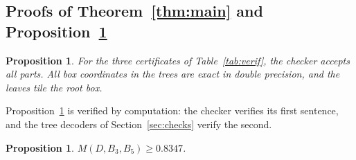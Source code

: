 \documentclass[11pt]{amsart}
\newtheorem{proposition}[theorem]{Proposition}
\theoremstyle{definition}
\theoremstyle{remark}
\numberwithin{equation}{section}
\newcommand{\LBTHREE}{0.8347}
\begin{document}
\subsection{Proofs of Theorem~\ref{thm:main} and Proposition~\ref{prop:five}}

\begin{proposition}\label{prop:cert}
For the three certificates of Table~\ref{tab:verif}, the checker accepts all parts. All box coordinates in the trees are exact in double precision, and the leaves tile the root box.
\end{proposition}

Proposition~\ref{prop:cert} is verified by computation: the checker verifies its first sentence, and the tree decoders of Section~\ref{sec:checks} verify the second.

\begin{proposition}\label{prop:five}
$M(D,B_3,B_5)\ge\LBTHREE$.
\end{proposition}
\end{document}
